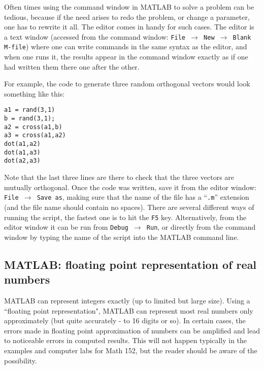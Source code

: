 Often times using the command window in MATLAB to solve a problem can be tedious, because if the need arises to redo the problem, or change a parameter, one has to rewrite it all. The editor comes in handy for such cases. The editor is a text window (accessed from the command window: {\tt File $\rightarrow$ New $\rightarrow$ Blank M-file}) where one can write commands in the same syntax as the editor, and when one runs it, the results appear in the command window exactly as if one had written them there one after the other.

For example, the code to generate three random orthogonal vectors would look something like this:
\begin{verbatim}
a1 = rand(3,1)
b = rand(3,1);
a2 = cross(a1,b)
a3 = cross(a1,a2)
dot(a1,a2)
dot(a1,a3)
dot(a2,a3)
\end{verbatim}
Note that the last three lines are there to check that the three vectors are mutually orthogonal. Once the code was written, save it from the editor window: {\tt File $\rightarrow$ Save as}, making sure that the name of the file has a ``{\tt .m}'' extension (and the file name should contain no spaces). There are several different ways of running the script, the fastest one is to hit the {\tt F5} key. Alternatively, from the editor window it can be run from {\tt Debug $\rightarrow$ Run}, or directly from the command window by typing the name of the script into the MATLAB command line.

\subsection{MATLAB: floating point representation of real numbers}
\label{sec:floating}

MATLAB can represent integers exactly (up to limited but large size). Using a 
``floating point representation", MATLAB can represent 
most real numbers only approximately (but quite accurately - to 16 digits or so). In certain 
cases, the errors made in floating point approximation of numbers can be amplified 
and lead to noticeable errors in computed results. This will not happen typically in the 
examples and computer labs for Math 152, but the reader should be aware of the possibility. 

